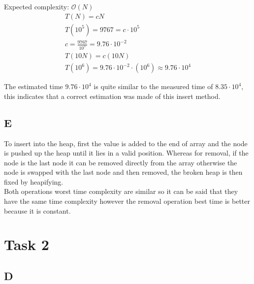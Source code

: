 \documentclass{article}
\begin{document}
Expected complexity: $\mathcal{O}(N)$ \\

\[
\begin{gathered}
    T(N) = c N \\
    T(10^5) = 9767 = c \cdot 10^5 \\
    c = \frac{9767}{10^5} = 9.76 \cdot 10^{-2} \\
    T(10N) = c(10N) \\
    T(10^6) = 9.76 \cdot 10^{-2} \cdot (10^6) \approx 9.76 \cdot 10^4
\end{gathered}
\]

The estimated time $9.76 \cdot 10^4$ is quite similar to the measured time of $8.35 \cdot 10^4$, this indicates that a correct estimation was made of this insert method.

\subsection{E}

To insert into the heap, first the value is added to the end of array and the node is pushed up the heap until it lies in a valid position. 
Whereas for removal, if the node is the last node it can be removed directly from the array otherwise the node is swapped with the last node and then removed, the broken heap is then fixed by heapifying. \\

Both operations worst time complexity are similar so it can be said that they have the same time complexity however the removal operation best time is better because it is constant. 

\section{Task 2}

\subsection{D}
\end{document}
